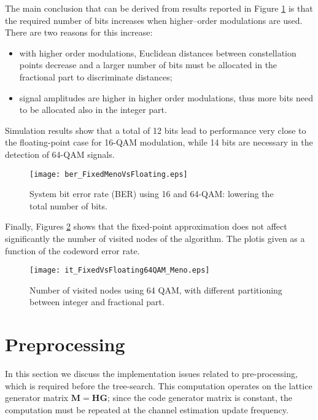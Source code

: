\documentclass[12pt,onecolumn,draftclsnofoot]{IEEEtran}
\begin{document}
The main conclusion that can be derived from 
results reported in Figure \ref{BER_Meno} is that the
required number of bits increases when
higher--order modulations are used. There are two reasons for
this increase:
\begin{itemize}
\item with higher order modulations, Euclidean distances between
constellation points decrease and a larger number of bits must be 
allocated in the fractional part to discriminate distances; 
\item signal amplitudes are higher in higher order modulations, 
thus more bits need to be allocated also in the integer part.
\end{itemize}
Simulation results show that a total of 12 bits lead to performance 
very close to the floating-point case for 16-QAM modulation,
while 14 bits are necessary in the detection of 64-QAM signals.
\begin{figure}[ht]
    \begin{center}
    \texttt{[image: ber\_FixedMenoVsFloating.eps]}
    \caption{System bit error rate (BER) using 16 and 64-QAM: lowering the total number of bits.}
    \label{BER_Meno}
    \end{center}
\end{figure}





Finally, Figures \ref{IT_64QAM_16} shows that the
fixed-point approximation does not affect significantly the number
of visited nodes of the algorithm. The plotis given as a function of the codeword error rate.
\begin{figure}[ht]
    \begin{center}
    \texttt{[image: it\_FixedVsFloating64QAM\_Meno.eps]}
    \caption{Number of visited nodes using 64 QAM, with different partitioning between integer and fractional part.}
    \label{IT_64QAM_16}
    \end{center}
\end{figure}

\section{Preprocessing}

\label{Preproc} In this section we discuss the implementation issues
related to pre-processing, which is required before the tree-search.
This computation operates on the lattice generator matrix $\boldsymbol
{M=HG}$; since the code generator matrix is constant, the computation
must be repeated at the channel estimation update frequency.
\end{document}
